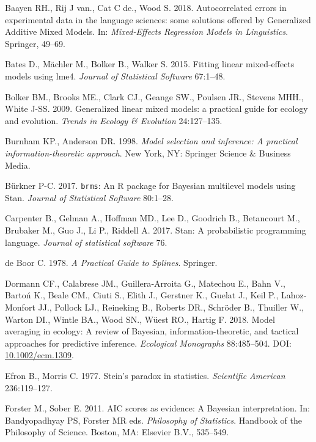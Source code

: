\documentclass[12pt]{article}
\begin{document}
\hypertarget{refs}{}
\hypertarget{ref-baayen_autocorrelated_2018}{}
Baayen RH., Rij J van., Cat C de., Wood S. 2018. Autocorrelated errors
in experimental data in the language sciences: some solutions offered by
Generalized Additive Mixed Models. In: \emph{Mixed-Effects Regression
Models in Linguistics}. Springer, 49--69.

\hypertarget{ref-bates_fitting_2015}{}
Bates D., Mächler M., Bolker B., Walker S. 2015. Fitting linear
mixed-effects models using lme4. \emph{Journal of Statistical Software}
67:1--48.

\hypertarget{ref-Bolker:2009cs}{}
Bolker BM., Brooks ME., Clark CJ., Geange SW., Poulsen JR., Stevens
MHH., White J-SS. 2009. Generalized linear mixed models: a practical
guide for ecology and evolution. \emph{Trends in Ecology \& Evolution}
24:127--135.

\hypertarget{ref-burnham_model_1998}{}
Burnham KP., Anderson DR. 1998. \emph{Model selection and inference: A
practical information-theoretic approach}. New York, NY: Springer
Science \& Business Media.

\hypertarget{ref-burkner_brms:_2017}{}
Bürkner P-C. 2017. \texttt{brms}: An R package for Bayesian multilevel
models using Stan. \emph{Journal of Statistical Software} 80:1--28.

\hypertarget{ref-carpenter_stan:_2017}{}
Carpenter B., Gelman A., Hoffman MD., Lee D., Goodrich B., Betancourt
M., Brubaker M., Guo J., Li P., Riddell A. 2017. Stan: A probabilistic
programming language. \emph{Journal of statistical software} 76.

\hypertarget{ref-deBoor:1978wq}{}
de Boor C. 1978. \emph{A Practical Guide to Splines}. Springer.

\hypertarget{ref-dormann_model_2018}{}
Dormann CF., Calabrese JM., Guillera‐Arroita G., Matechou E., Bahn V.,
Bartoń K., Beale CM., Ciuti S., Elith J., Gerstner K., Guelat J., Keil
P., Lahoz‐Monfort JJ., Pollock LJ., Reineking B., Roberts DR., Schröder
B., Thuiller W., Warton DI., Wintle BA., Wood SN., Wüest RO., Hartig F.
2018. Model averaging in ecology: A review of Bayesian,
information-theoretic, and tactical approaches for predictive inference.
\emph{Ecological Monographs} 88:485--504. DOI:
\href{https://doi.org/10.1002/ecm.1309}{10.1002/ecm.1309}.

\hypertarget{ref-efron_steins_1977}{}
Efron B., Morris C. 1977. Stein's paradox in statistics.
\emph{Scientific American} 236:119--127.

\hypertarget{ref-forster_aic_2011}{}
Forster M., Sober E. 2011. AIC scores as evidence: A Bayesian
interpretation. In: Bandyopadhyay PS, Forster MR eds. \emph{Philosophy
of Statistics}. Handbook of the Philosophy of Science. Boston, MA:
Elsevier B.V., 535--549.
\end{document}
